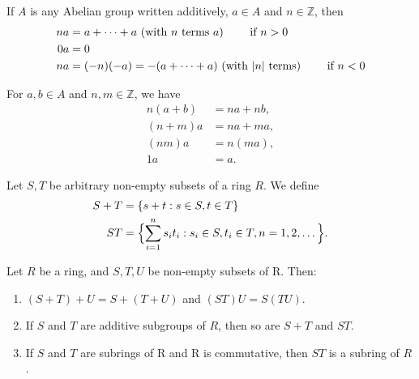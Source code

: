 \begin{Def}
  If $A$ is any Abelian group written additively, $a \in A$ and $n \in
  \mathbb{Z}$, then
  \begin{align*}
    na &= a + \cdots + a \text{ (with $n$ terms $a$) \qquad if }n > 0\\
    0a &= 0\\
    na &= (-n)(-a) = -(a + \cdots + a) \text{ (with $|n|$ terms) \qquad if }n < 0
  \end{align*}

  For $a, b \in A$ and $n, m \in \mathbb{Z}$, we have
  \begin{align*}
    n(a+b) &= na + nb,\\
    (n+m)a &= na + ma,\\
    (nm)a &= n(ma),\\
    1a &= a.
  \end{align*}
\end{Def}

\begin{Def}
  Let $S, T$ be arbitrary non-empty subsets of a ring $R$. We define
  \begin{align*}
    S + T &= \{ s+t: s \in S, t \in T \}\\
    ST &= \Bigl\{\sum^{n}_{i = 1} s_i t_i : s_i \in S, t_i \in T, n = 1, 2, \dots \Bigr\} .
  \end{align*}

\end{Def}

\begin{Lemma}
  Let $R$ be a ring, and $S, T, U$ be non-empty subsets of R. Then:
  \begin{enumerate}[label=(\roman*)]
    \item $(S + T) + U = S + (T + U)$ and $(ST)U = S(TU)$.
    \item If $S$ and $T$ are additive subgroups of $R$, then so are $S+T$ and
      $ST$.
    \item If $S$ and $T$ are subrings of R and R is commutative, then $ST$ is a
      subring of $R$.
  \end{enumerate}
\end{Lemma}

